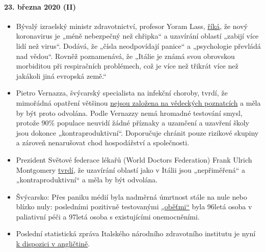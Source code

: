 \hypertarget{23-bux159ezna-2020-ii}{%
\paragraph{23. března 2020 (II)}\label{23-bux159ezna-2020-ii}}

\begin{itemize}
\tightlist
\item
  Bývalý izraelský ministr zdravotnictví, profesor Yoram Lass,
  \href{https://en.globes.co.il/en/article-lockdown-lunacy-1001322696}{říká},
  že nový koronavirus je „méně nebezpečný než chřipka`` a uzavírání
  oblastí „zabijí více lidí než virus``. Dodává, že „čísla neodpovídají
  panice`` a „psychologie převládá nad vědou``. Rovněž poznamenává, že
  „Itálie je známá svou obrovskou morbiditou při respiračních
  problémech, což je více než třikrát více než jakákoli jiná evropská
  země.``
\item
  Pietro Vernazza, švýcarský specialista na infekční choroby, tvrdí, že
  mimořádná opatření většinou
  \href{https://www.tagblatt.ch/leben/ostschweizer-infektiologe-pietro-vernazza-die-zahlen-zu-den-jungen-corona-virus-erkrankten-sind-irrefuehrend-ld.1206440}{nejsou
  založena na vědeckých poznatcích} a měla by být proto odvolána. Podle
  Vernazzy nemá hromadné testování smysl, protože 90\% populace neuvidí
  žádné příznaky a uzamčení a uzavření školy jsou dokonce
  „kontraproduktivní``. Doporučuje chránit pouze rizikové skupiny a
  zároveň nenarušovat chod hospodářství a společnosti.
\item
  Prezident Světové federace lékařů (World Doctors Federation) Frank
  Ulrich Montgomery
  \href{https://www.general-anzeiger-bonn.de/news/politik/deutschland/interview-mit-weltaerztepraesident-montgomery-ueber-corona-pandemie-ist-chaos_aid-49609561}{tvrdí},
  že uzavírání oblastí jako v Itálii jsou „nepřiměřená`` a
  „kontraproduktivní`` a měla by být odvolána.
\item
  Švýcarsko: Přes paniku médií byla nadměrná úmrtnost stále na nule nebo
  blízko nuly: posledními pozitivně testovanými
  \href{https://www.bluewin.ch/de/newsregional/zuerich/1068-bestatigte-corona-falle-und-funf-todesfalle-im-kanton-zurich-371873.html}{„oběťmi``}
  byla 96letá osoba v paliativní péči a 97letá osoba s existujícími
  onemocněními.
\item
  Poslední statistická zpráva Italského národního zdravotního institutu
  je nyní
  \href{https://www.epicentro.iss.it/coronavirus/bollettino/Report-COVID-2019_20_marzo_eng.pdf}{k
  dispozici v angličtině}.
\end{itemize}

